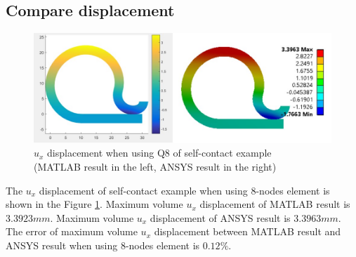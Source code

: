 \subsection{Compare displacement}

\begin{figure}[H]
    \centering
    \includegraphics[scale=0.6]{Figures/chapter5/s_q8_ux.jpg}
    \decoRule
    \caption{$u_x$ displacement when using Q8 of self-contact example \\
    (MATLAB result in the left, ANSYS result in the right)}
    \label{fig:s_q8_ux}
\end{figure}
The $u_x$ displacement of self-contact example when using 8-nodes element is shown in the Figure \ref{fig:s_q8_ux}.
Maximum volume $u_x$ displacement of MATLAB result is $3.3923 mm$.
Maximum volume $u_x$ displacement of ANSYS result is $3.3963 mm$.
The error of maximum volume $u_x$ displacement between MATLAB result and ANSYS result when using 8-nodes element is $0.12\%$.
\newline


